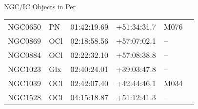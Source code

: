 \begin{block}{NGC/IC Objects in Per}
  \centering
  \begin{tabularx}{\textwidth}{llrrll} 
    NGC0650 & PN & 01:42:19.69 & +51:34:31.7  & M076 \\ 
    NGC0869 & OCl & 02:18:58.56 & +57:07:02.1  & -- \\ 
    NGC0884 & OCl & 02:22:32.10 & +57:08:38.8  & -- \\ 
    NGC1023 & Glx & 02:40:24.01 & +39:03:47.8  & -- \\ 
    NGC1039 & OCl & 02:42:07.40 & +42:44:46.1  & M034 \\ 
    NGC1528 & OCl & 04:15:18.87 & +51:12:41.3  & -- \\ 
  \end{tabularx}
\end{block}